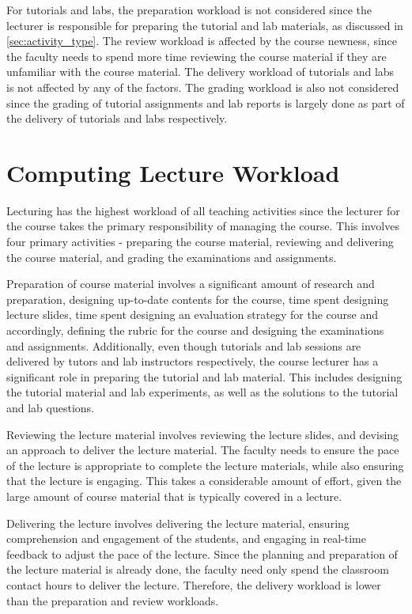 For tutorials and labs, the preparation workload is not considered since the lecturer is responsible for preparing the tutorial and lab materials, as discussed in \autoref{sec:activity_type}. The review workload is affected by the course newness, since the faculty needs to spend more time reviewing the course material if they are unfamiliar with the course material. The delivery workload of tutorials and labs is not affected by any of the factors. The grading workload is also not considered since the grading of tutorial assignments and lab reports is largely done as part of the delivery of tutorials and labs respectively.


\section{Computing Lecture Workload}

Lecturing has the highest workload of all teaching activities since the lecturer for the course takes the primary responsibility of managing the course. This involves four primary activities - preparing the course material, reviewing and delivering the course material, and grading the examinations and assignments.

Preparation of course material involves a significant amount of research and preparation, designing up-to-date contents for the course, time spent designing lecture slides, time spent designing an evaluation strategy for the course and accordingly, defining the rubric for the course and designing the examinations and assignments. Additionally, even though tutorials and lab sessions are delivered by tutors and lab instructors respectively, the course lecturer has a significant role in preparing the tutorial and lab material. This includes designing the tutorial material and lab experiments, as well as the solutions to the tutorial and lab questions.

Reviewing the lecture material involves reviewing the lecture slides, and devising an approach to deliver the lecture material. The faculty needs to ensure the pace of the lecture is appropriate to complete the lecture materials, while also ensuring that the lecture is engaging. This takes a considerable amount of effort, given the large amount of course material that is typically covered in a lecture.

Delivering the lecture involves delivering the lecture material, ensuring comprehension and engagement of the students, and engaging in real-time feedback to adjust the pace of the lecture. Since the planning and preparation of the lecture material is already done, the faculty need only spend the classroom contact hours to deliver the lecture. Therefore, the delivery workload is lower than the preparation and review workloads.

